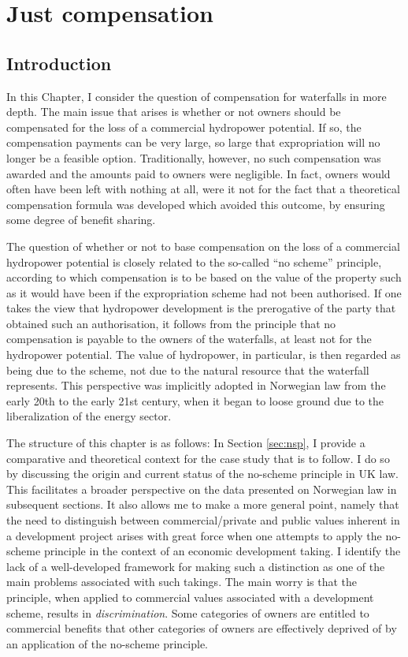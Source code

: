 \chapter{Just compensation}\label{chap:5}

\section{Introduction}\label{sec:into5}

In this Chapter, I consider the question of compensation for waterfalls in more depth. The main issue that arises is whether or not owners should be compensated for the loss of a commercial hydropower potential. If so, the compensation payments can be very large, so large that expropriation will no longer be a feasible option. Traditionally, however, no such compensation was awarded and the amounts paid to owners were negligible. In fact, owners would often have been left with nothing at all, were it not for the fact that a theoretical compensation formula was developed which avoided this outcome, by ensuring some degree of benefit sharing.

The question of whether or not to base compensation on the loss of a commercial hydropower potential is closely related to the so-called ``no scheme'' principle, according to which compensation is to be based on the value of the property such as it would have been if the expropriation scheme had not been authorised. If one takes the view that hydropower development is the prerogative of the party that obtained such an authorisation, it follows from the principle that no compensation is payable to the owners of the waterfalls, at least not for the hydropower potential. The value of hydropower, in particular, is then regarded as being due to the scheme, not due to the natural resource that the waterfall represents. This perspective was implicitly adopted in Norwegian law from the early 20th to the early 21st century, when it began to loose ground due to the liberalization of the energy sector.

The structure of this chapter is as follows: In Section \ref{sec:nsp}, I provide a comparative and theoretical context for the case study that is to follow. I do so by discussing the origin and current status of the no-scheme principle in UK law. This facilitates a broader perspective on the data presented on Norwegian law in subsequent sections.  It also allows me to make a more general point, namely that the need to distinguish between commercial/private and public values inherent in a development project arises with great force when one attempts to apply the no-scheme principle in the context of an economic development taking. I identify the lack of a well-developed framework for making such a distinction as one of the main problems associated with such takings. The main worry is that the principle, when applied to commercial values associated with a development scheme, results in {\it discrimination}. Some categories of owners are entitled to commercial benefits that other categories of owners are effectively deprived of by an application of the no-scheme principle.

